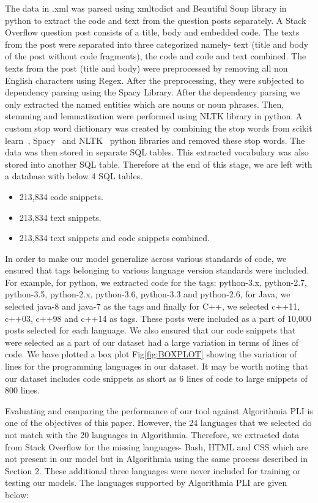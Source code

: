 \documentclass[letterpaper, 10 pt, conference]{ieeeconf}  %
\begin{document}
 
The data in .xml was parsed using xmltodict and Beautiful Soup library in python to extract the code and text from the question posts separately. A Stack Overflow question post consists of a title, body and embedded code. The texts from the post were separated into three categorized namely- text (title and body of the post without code fragments), the code and code and text combined. The texts from the post (title and body) were preprocessed by removing all non English characters using Regex. After the preprocessing, they were subjected to dependency parsing using the Spacy Library. After the dependency parsing we only extracted the named entities which are nouns or noun phrases. Then, stemming and lemmatization were performed using NLTK library in python. A custom stop word dictionary was created by combining the stop words from scikit learn~\cite{c13}, Spacy~\cite{c23} and NLTK~\cite{c12} python libraries and removed these stop words. The data was then stored in separate SQL tables. This extracted vocabulary was also stored into another SQL table. Therefore at the end of this stage, we are left with a database with below 4 SQL tables.

\begin{itemize}
  \item 213,834 code snippets.
  \item 213,834 text snippets.
  \item 213,834 text snippets and code snippets combined.

\end{itemize}

In order to make our model generalize across various standards of code, we ensured that tags belonging to various language version standards were included. For example, for python, we extracted code for the tags: python-3.x, python-2.7, python-3.5, python-2.x, python-3.6, python-3.3 and python-2.6, for Java, we selected java-8 and java-7 as the tags and finally for C++, we selected c++11, c++03, c++98 and c++14 as tags. These posts were included as a part of 10,000 posts selected for each language. We also ensured that our code snippets that were selected as a part of our dataset had a large variation in terms of lines of code. We have plotted a box plot Fig\ref{fig:BOXPLOT} showing the variation of lines for the programming languages in our dataset. It may be worth noting that our dataset includes code snippets as short as 6 lines of code to large snippets of 800 lines. 
 
Evaluating and comparing the performance of our tool against Algorithmia PLI is one of the objectives of this paper. However, the 24 languages that we selected do not match with the 20 languages in Algorithmia. Therefore, we extracted data from Stack Overflow for the missing languages- Bash, HTML and CSS which are not present in our model but in Algorithmia using the same process described in Section 2. These additional three languages were never included for training or testing our models. The languages supported by Algorithmia PLI are given below:
\end{document}
